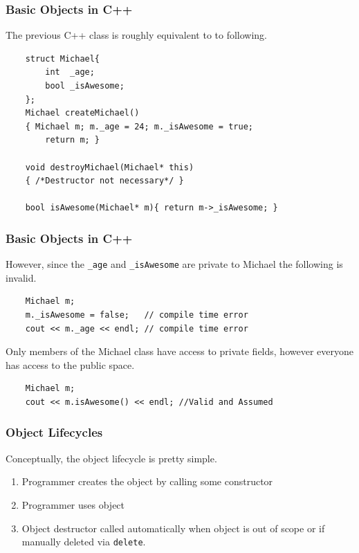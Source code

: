 \documentclass{beamer}
\begin{document}
\begin{frame}[fragile]
    \frametitle{Basic Objects in C++}
    The previous C++ class is roughly equivalent to to following.
    \begin{verbatim}
    struct Michael{
        int  _age;
        bool _isAwesome; 
    };
    Michael createMichael() 
    { Michael m; m._age = 24; m._isAwesome = true; 
        return m; }

    void destroyMichael(Michael* this) 
    { /*Destructor not necessary*/ }

    bool isAwesome(Michael* m){ return m->_isAwesome; }
    \end{verbatim}
\end{frame}

\begin{frame}[fragile]
    \frametitle{Basic Objects in C++}

    However, since the \texttt{\_age} and \texttt{\_isAwesome} are private to Michael the following is invalid.

    \begin{verbatim}
    Michael m;
    m._isAwesome = false;   // compile time error
    cout << m._age << endl; // compile time error
    \end{verbatim}

    Only members of the Michael class have access to private fields, however everyone has access to the public space.
    \begin{verbatim}
    Michael m;
    cout << m.isAwesome() << endl; //Valid and Assumed   
    \end{verbatim}
\end{frame}

\begin{frame}
    \frametitle{Object Lifecycles}
    Conceptually, the object lifecycle is pretty simple.
    \begin{enumerate}
        \item Programmer creates the object by calling some constructor
        \item Programmer uses object
        \item Object destructor called automatically when object is out of scope or if manually deleted via \texttt{delete}.
    \end{enumerate}
\end{frame}
\end{document}
